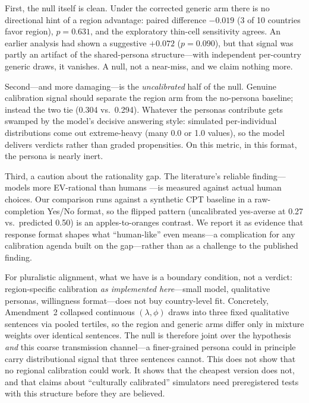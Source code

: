 \documentclass[10pt,letterpaper]{article}
\begin{document}
First, the null itself is clean. Under the corrected generic arm there is
no directional hint of a region advantage: paired difference $-0.019$ (3 of
10 countries favor region), $p=0.631$, and the exploratory thin-cell
sensitivity agrees. An earlier analysis had shown a suggestive $+0.072$
($p=0.090$), but that signal was partly an artifact of the shared-persona
structure---with independent per-country generic draws, it vanishes. A
null, not a near-miss, and we claim nothing more.

Second---and more damaging---is the \textit{uncalibrated} half of the
null. Genuine calibration signal should separate the region arm from the
no-persona baseline; instead the two tie (0.304 vs.\ 0.294). Whatever the
personas contribute gets swamped by the model's decisive answering style:
simulated per-individual distributions come out extreme-heavy (many 0.0 or
1.0 values), so the model delivers verdicts rather than graded
propensities. On this metric, in this format, the persona is nearly inert.

Third, a caution about the rationality gap. The literature's reliable
finding---models more EV-rational than humans \citep{liu2025}---is measured
against actual human choices. Our comparison runs against a synthetic CPT
baseline in a raw-completion Yes/No format, so the flipped pattern
(uncalibrated yes-averse at 0.27 vs.\ predicted 0.50) is an
apples-to-oranges contrast. We report it as evidence that response format
shapes what ``human-like'' even means---a complication for any calibration
agenda built on the gap---rather than as a challenge to the published
finding.

For pluralistic alignment, what we have is a boundary condition, not a
verdict: region-specific calibration \textit{as implemented here}---small
model, qualitative personas, willingness format---does not buy
country-level fit. Concretely, Amendment~2 collapsed continuous
$(\lambda,\phi)$ draws into three fixed qualitative sentences via pooled
tertiles, so the region and generic arms differ only in mixture weights
over identical sentences. The null is therefore joint over the hypothesis
\textit{and} this coarse transmission channel---a finer-grained persona
could in principle carry distributional signal that three sentences
cannot. This does not show that no regional calibration could work. It
shows that the cheapest version does not, and that claims about
``culturally calibrated'' simulators need preregistered tests with this
structure before they are believed.
\end{document}
